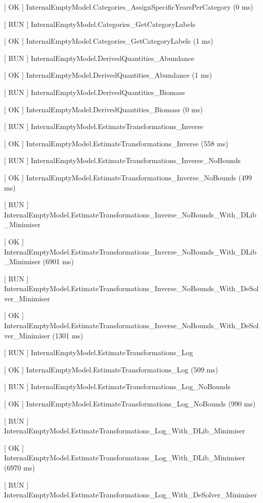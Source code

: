 \documentclass[a4paper,11pt,twoside,pdftex,draft]{article}
\begin{document}
{[} OK {]} InternalEmptyModel.Categories\_AssignSpecificYearsPerCategory
(0 ms)

{[} RUN {]} InternalEmptyModel.Categories\_GetCategoryLabels

{[} OK {]} InternalEmptyModel.Categories\_GetCategoryLabels (1 ms)

{[} RUN {]} InternalEmptyModel.DerivedQuantities\_Abundance

{[} OK {]} InternalEmptyModel.DerivedQuantities\_Abundance (1 ms)

{[} RUN {]} InternalEmptyModel.DerivedQuantities\_Biomass

{[} OK {]} InternalEmptyModel.DerivedQuantities\_Biomass (0 ms)

{[} RUN {]} InternalEmptyModel.EstimateTransformations\_Inverse

{[} OK {]} InternalEmptyModel.EstimateTransformations\_Inverse (558 ms)

{[} RUN {]}
InternalEmptyModel.EstimateTransformations\_Inverse\_NoBounds

{[} OK {]} InternalEmptyModel.EstimateTransformations\_Inverse\_NoBounds
(499 ms)

{[} RUN {]}
InternalEmptyModel.EstimateTransformations\_Inverse\_NoBounds\_With\_DLib\_Minimiser

{[} OK {]}
InternalEmptyModel.EstimateTransformations\_Inverse\_NoBounds\_With\_DLib\_Minimiser
(6901 ms)

{[} RUN {]}
InternalEmptyModel.EstimateTransformations\_Inverse\_NoBounds\_With\_DeSolver\_Minimiser

{[} OK {]}
InternalEmptyModel.EstimateTransformations\_Inverse\_NoBounds\_With\_DeSolver\_Minimiser
(1301 ms)

{[} RUN {]} InternalEmptyModel.EstimateTransformations\_Log

{[} OK {]} InternalEmptyModel.EstimateTransformations\_Log (509 ms)

{[} RUN {]} InternalEmptyModel.EstimateTransformations\_Log\_NoBounds

{[} OK {]} InternalEmptyModel.EstimateTransformations\_Log\_NoBounds
(990 ms)

{[} RUN {]}
InternalEmptyModel.EstimateTransformations\_Log\_With\_DLib\_Minimiser

{[} OK {]}
InternalEmptyModel.EstimateTransformations\_Log\_With\_DLib\_Minimiser
(6970 ms)

{[} RUN {]}
InternalEmptyModel.EstimateTransformations\_Log\_With\_DeSolver\_Minimiser
\end{document}
